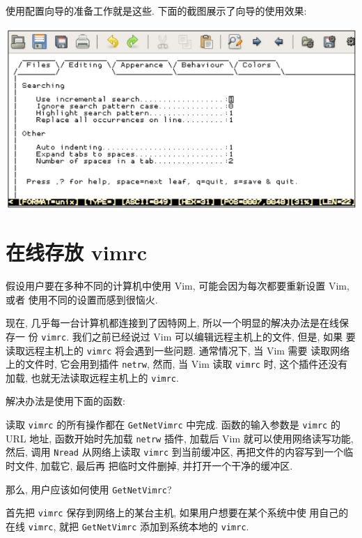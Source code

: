 使用配置向导的准备工作就是这些. 下面的截图展示了向导的使用效果:
\begin{center}
\includegraphics[scale=0.6]{./images/page221.png}
\end{center}

\section{在线存放 vimrc}
\label{sec:storing_vimrc_online}

假设用户要在多种不同的计算机中使用 Vim, 可能会因为每次都要重新设置 Vim, 或者
使用不同的设置而感到很恼火.

现在, 几乎每一台计算机都连接到了因特网上, 所以一个明显的解决办法是在线保存一
份 \texttt{vimrc}. 我们之前已经说过 Vim 可以编辑远程主机上的文件, 但是, 如果
要读取远程主机上的 \texttt{vimrc} 将会遇到一些问题. 通常情况下, 当 Vim 需要
读取网络上的文件时, 它会用到插件 \texttt{netrw}, 然而, 当 Vim 读取
\texttt{vimrc} 时, 这个插件还没有加载, 也就无法读取远程主机上的 \texttt{vimrc}.

解决办法是使用下面的函数:
读取 \texttt{vimrc} 的所有操作都在 \texttt{GetNetVimrc} 中完成. 函数的输入参数是
\texttt{vimrc} 的 URL 地址, 函数开始时先加载 \texttt{netrw} 插件, 加载后
Vim 就可以使用网络读写功能, 然后, 调用 \texttt{Nread} 从网络上读取
\texttt{vimrc} 到当前缓冲区, 再把文件的内容写到一个临时文件, 加载它, 最后再
把临时文件删掉, 并打开一个干净的缓冲区.

那么, 用户应该如何使用 \texttt{GetNetVimrc}?

首先把 \texttt{vimrc} 保存到网络上的某台主机, 如果用户想要在某个系统中使
用自己的在线 \texttt{vimrc}, 就把 \texttt{GetNetVimrc} 添加到系统本地的
\texttt{vimrc}.

